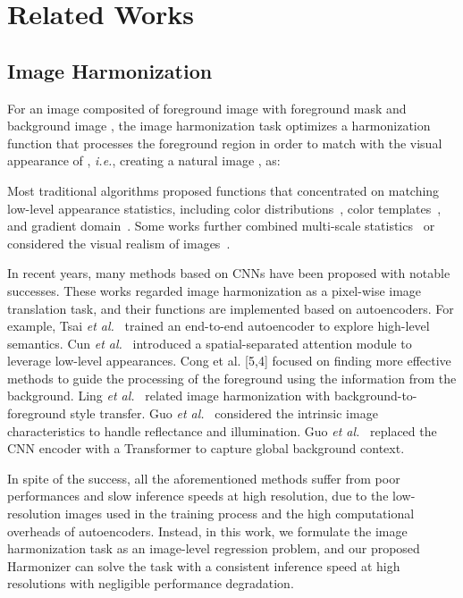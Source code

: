 \documentclass[runningheads]{llncs}
\begin{document}
\section{Related Works}

\subsection{Image Harmonization}

For an image composited of foreground image  with foreground mask  and background image , the image harmonization task optimizes a harmonization function  that processes the foreground region  in order to match with the visual appearance of , {\it i.e.}, creating a natural image , as: 

Most traditional algorithms proposed  functions that concentrated on matching low-level appearance statistics, including color distributions~\cite{IHCD1,IHCD2,IHCD3,IHCD4}, color templates~\cite{IHCT1}, and gradient domain~\cite{IHGD1,IHGD2,IHGD3}. Some works further combined multi-scale statistics~\cite{IHMS1} or considered the visual realism of images~\cite{IHHV1,IHHV2}.


In recent years, many methods based on CNNs have been proposed with notable successes. These works regarded image harmonization as a pixel-wise image translation task, and their  functions are implemented based on autoencoders. For example, Tsai {\it et al.}~\cite{DIH} trained an end-to-end autoencoder to explore high-level semantics. Cun {\it et al.}~\cite{S2AM} introduced a spatial-separated attention module to leverage low-level appearances. Cong et al. [5,4] focused on finding more effective methods to guide the processing of the foreground using the information from the background.
Ling {\it et al.}~\cite{RAIN} related image harmonization with background-to-foreground style transfer. Guo {\it et al.}~\cite{IntrinsicIH} considered the intrinsic image characteristics to handle reflectance and illumination. Guo {\it et al.}~\cite{TransformerIH} replaced the CNN encoder with a Transformer to capture global background context. 

In spite of the success, all the aforementioned methods suffer from poor performances and slow inference speeds at high resolution, due to the low-resolution images used in the training process and the high computational overheads of autoencoders.
Instead, in this work, we formulate the image harmonization task as an image-level regression problem, and our proposed Harmonizer can solve the task with a consistent inference speed at high resolutions with negligible performance degradation. 
\end{document}
